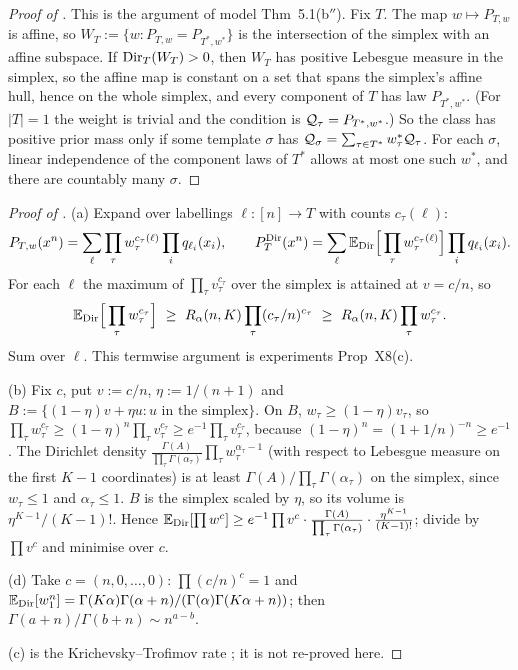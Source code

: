 \begin{proof}[Proof of ]
This is the argument of model Thm~5.1(b$''$). Fix $T$. The map $w\mapsto P_{T,w}$ is affine, so $W_T:=\{w:P_{T,w}=P_{T^*,w^*}\}$ is the intersection of the simplex with an affine subspace. If $\mathrm{Dir}_T(W_T)>0$, then $W_T$ has positive Lebesgue measure in the simplex, so the affine map is constant on a set that spans the simplex's affine hull, hence on the whole simplex, and every component of $T$ has law $P_{T^*,w^*}$. (For $|T|=1$ the weight is trivial and the condition is $\mathcal{Q}_\tau=P_{T^*,w^*}$.) So the class has positive prior mass only if some template $\sigma$ has $\mathcal{Q}_\sigma=\sum_{\tau\in T^*}w^*_\tau\mathcal{Q}_\tau$. For each $\sigma$, linear independence of the component laws of $T^*$ allows at most one such $w^*$, and there are countably many $\sigma$.
\end{proof}

\begin{proof}[Proof of ]
(a) Expand over labellings $\ell:[n]\to T$ with counts $c_\tau(\ell)$:
\[
P_{T,w}(x^n)=\sum_\ell\prod_\tau w_\tau^{c_\tau(\ell)}\prod_iq_{\ell_i}(x_i),\qquad
P^{\mathrm{Dir}}_{T}(x^n)=\sum_\ell\mathbb{E}_{\mathrm{Dir}}\Big[\prod_\tau w_\tau^{c_\tau(\ell)}\Big]\prod_iq_{\ell_i}(x_i).
\]
For each $\ell$ the maximum of $\prod_\tau v_\tau^{c_\tau}$ over the simplex is attained at $v=c/n$, so
\[
\Ex_{\Dir}\Big[\prod_\tau w_\tau^{c_\tau}\Big]\ \ge\ \Rreg(n,K)\prod_\tau(c_\tau/n)^{c_\tau}\ \ge\ \Rreg(n,K)\prod_\tau w_\tau^{c_\tau}.
\]
Sum over $\ell$. This termwise argument is experiments Prop~X8(c).

(b) Fix $c$, put $v:=c/n$, $\eta:=1/(n+1)$ and $B:=\{(1-\eta)v+\eta u:u\text{ in the simplex}\}$. On $B$, $w_\tau\ge(1-\eta)v_\tau$, so $\prod_\tau w_\tau^{c_\tau}\ge(1-\eta)^n\prod_\tau v_\tau^{c_\tau}\ge e^{-1}\prod_\tau v_\tau^{c_\tau}$, because $(1-\eta)^n=(1+1/n)^{-n}\ge e^{-1}$. The Dirichlet density $\frac{\Gamma(A)}{\prod_\tau\Gamma(\alpha_\tau)}\prod_\tau w_\tau^{\alpha_\tau-1}$ (with respect to Lebesgue measure on the first $K-1$ coordinates) is at least $\Gamma(A)/\prod_\tau\Gamma(\alpha_\tau)$ on the simplex, since $w_\tau\le1$ and $\alpha_\tau\le1$. $B$ is the simplex scaled by $\eta$, so its volume is $\eta^{K-1}/(K-1)!$. Hence $\mathbb{E}_{\mathrm{Dir}}[\prod w^c]\ge e^{-1}\prod v^c\cdot\frac{\Gamma(A)}{\prod_\tau\Gamma(\alpha_\tau)}\cdot\frac{\eta^{K-1}}{(K-1)!}$; divide by $\prod v^c$ and minimise over $c$.

(d) Take $c=(n,0,\dots,0)$: $\prod(c/n)^c=1$ and $\mathbb{E}_{\mathrm{Dir}}[w_1^n]=\Gamma(K\alpha)\Gamma(\alpha+n)/(\Gamma(\alpha)\Gamma(K\alpha+n))$; then $\Gamma(a+n)/\Gamma(b+n)\sim n^{a-b}$.

(c) is the Krichevsky--Trofimov rate \citep{krichevsky1981performance}; it is not re-proved here.
\end{proof}

